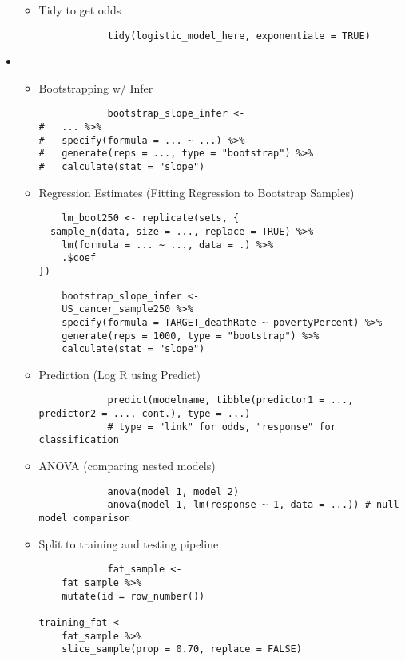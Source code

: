\documentclass[8pt,landscape,a4paper, fleqn, dvipsnames]{extarticle}
\begin{document}
\begin{multicols*}{4}
\begin{itemize}
\begin{itemize}
\begin{lstlisting}
        \end{lstlisting}
        \item Tidy to get odds
        \begin{lstlisting}
            tidy(logistic_model_here, exponentiate = TRUE)
        \end{lstlisting}
    \end{itemize}
    \item \begin{itemize}
        \item Bootstrapping w/ Infer
        \begin{lstlisting}
            bootstrap_slope_infer <- 
#   ... %>% 
#   specify(formula = ... ~ ...) %>%
#   generate(reps = ..., type = "bootstrap") %>% 
#   calculate(stat = "slope")
        \end{lstlisting}
        \item Regression Estimates (Fitting Regression to Bootstrap Samples)
        \begin{lstlisting}
    lm_boot250 <- replicate(sets, {
  sample_n(data, size = ..., replace = TRUE) %>%
    lm(formula = ... ~ ..., data = .) %>%
    .$coef
}) 
        \end{lstlisting}
        \begin{lstlisting}
    bootstrap_slope_infer <- 
    US_cancer_sample250 %>% 
    specify(formula = TARGET_deathRate ~ povertyPercent) %>%
    generate(reps = 1000, type = "bootstrap") %>% 
    calculate(stat = "slope")
        \end{lstlisting}
        \item Prediction (Log R using Predict)
        \begin{lstlisting}
            predict(modelname, tibble(predictor1 = ..., predictor2 = ..., cont.), type = ...)
            # type = "link" for odds, "response" for classification
        \end{lstlisting}
        \item ANOVA (comparing nested models)
        \begin{lstlisting}
            anova(model 1, model 2)
            anova(model 1, lm(response ~ 1, data = ...)) # null model comparison
        \end{lstlisting}
        \item Split to training and testing pipeline
        \begin{lstlisting}
            fat_sample <- 
    fat_sample %>%
    mutate(id = row_number())

training_fat <- 
    fat_sample %>%
    slice_sample(prop = 0.70, replace = FALSE)


\end{lstlisting}
\end{itemize}
\end{itemize}
\end{multicols*}
\end{document}
